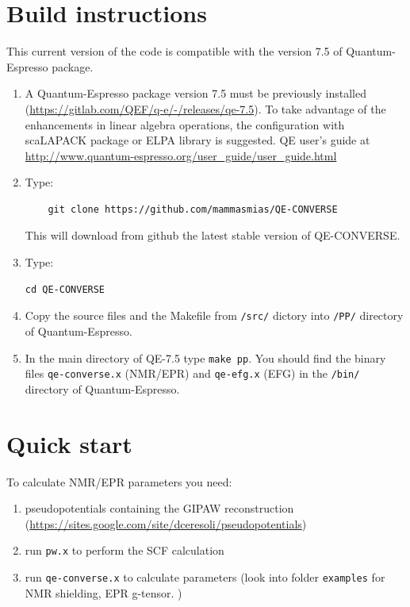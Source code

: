 \documentclass[a4paper,11pt,twoside]{article}
\begin{document}
\section{Build instructions}
This current version of the code is compatible with the version 7.5 of Quantum-Espresso package.
\begin{enumerate}
\item A Quantum-Espresso package version 7.5 must be previously installed (\url{https://gitlab.com/QEF/q-e/-/releases/qe-7.5}). To take advantage of the enhancements in linear algebra operations, the configuration with scaLAPACK package or ELPA library is suggested.
QE user's guide at \url{http://www.quantum-espresso.org/user_guide/user_guide.html}
\item Type:
\begin{verbatim}
    git clone https://github.com/mammasmias/QE-CONVERSE 
\end{verbatim}
This will download from github the latest stable version of QE-CONVERSE.
\item Type:
\begin{verbatim}
cd QE-CONVERSE
\end{verbatim}
\item 
 Copy the source files and the Makefile from \texttt{/src/} dictory into \texttt{/PP/} directory of Quantum-Espresso.
\item
 In the main directory of QE-7.5 type \texttt{make pp}. You should find the binary files \texttt{qe-converse.x} (NMR/EPR) and \texttt{qe-efg.x} (EFG) in the \texttt{/bin/} directory of Quantum-Espresso.
\end{enumerate}
\section{Quick start}
To calculate NMR/EPR parameters you need: 
\begin{enumerate}
\item pseudopotentials containing the GIPAW reconstruction (\url{https://sites.google.com/site/dceresoli/pseudopotentials})
\item run \texttt{pw.x} to perform the SCF calculation 
\item run \texttt{qe-converse.x} to calculate parameters (look into folder
\texttt{examples} for NMR shielding, EPR g-tensor.
)
\end{enumerate}
\end{document}

